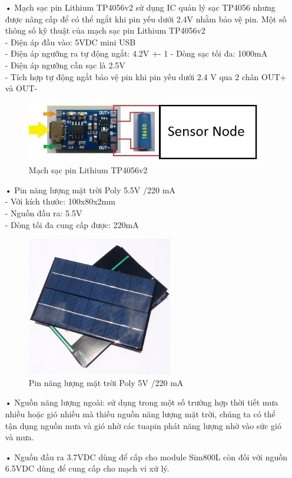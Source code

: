 \begin{itemize}
\item[•]Mạch sạc pin Lithium TP4056v2 sử dụng IC quản lý sạc TP4056 nhưng được nâng cấp để có thể ngắt khi pin yếu dưới 2.4V nhằm bảo vệ pin. Một số thông số kỹ thuật của mạch sạc pin Lithium TP4056v2\\
-	Điện áp đầu vào: 5VDC mini USB\\
-	Điện áp ngưỡng ra tự động ngắt: 4.2V +- 1%
-	Dòng sạc tối đa: 1000mA\\
-	Điện áp ngưỡng cần sạc là 2.5V\\
-	Tích hợp tự động ngắt bảo vệ pin khi pin yếu dưới 2.4 V qua 2 chân OUT+ và OUT-
	\begin{figure}[H]
	\centering    
	\includegraphics[width=5in]{tp4056}
	\caption[Mạch sạc pin Lithium TP4056v2]{Mạch sạc pin Lithium TP4056v2}
	\label{fig:tp4056}
	\end{figure}
\item[•]Pin năng lượng mặt trời Poly 5.5V /220 mA\\
-	Với kích thước: 100x80x2mm\\
-	Nguồn đầu ra: 5.5V\\
-	Dòng tối đa cung cấp được: 220mA\\
\begin{figure}[H]
\centering    
\includegraphics[width=0.6\textwidth]{solarpanel_real}
\caption[Pin năng lượng mặt trời Poly 5V /220 mA]{Pin năng lượng mặt trời Poly 5V /220 mA}
\label{fig:solarpanel_real}
\end{figure}

\item[•]Nguồn năng lượng ngoài: sử dụng trong một số trường hợp thời tiết mưa nhiều hoặc gió nhiều mà thiếu nguồn năng lượng mặt trời, chúng ta có thể tận dụng nguồn mưa và gió nhờ các tuapin phát năng lượng nhờ vào sức gió và mưa.
\item[•] Nguồn đầu ra 3.7VDC dùng để cấp cho module Sim800L còn đối với nguồn 6.5VDC dùng để cung cấp cho mạch vi xử lý.
\end{itemize}


